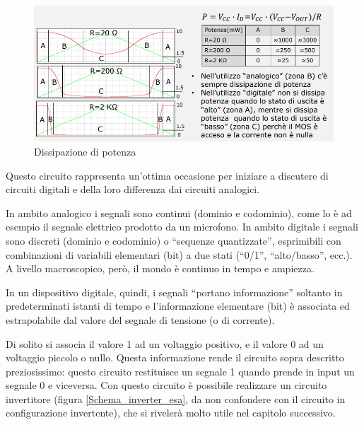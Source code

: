 \documentclass{article}
\begin{document}
\begin{figure}[h!]
  \centering
  \includegraphics[scale=0.58]{IM_inverter_penta}
  \caption{Dissipazione di potenza}
  \label{Schema_inverter_penta}
\end{figure}

\clearpage

Questo circuito rappresenta un'ottima occasione per iniziare a discutere di circuiti digitali e della loro differenza dai circuiti analogici. 

\vspace{3mm}

In ambito analogico i segnali sono continui (dominio e codominio), come lo è ad esempio il segnale elettrico prodotto da un microfono. In ambito digitale i segnali sono discreti (dominio e codominio) o ``sequenze quantizzate'', esprimibili con combinazioni di variabili elementari (bit) a due stati (``0/1'', ``alto/basso'', ecc.). A livello macroscopico, però, il mondo è continuo in tempo e ampiezza. 

\vspace{3mm}

In un dispositivo digitale, quindi, i segnali ``portano informazione'' soltanto in predeterminati istanti di tempo e l’informazione elementare (bit) è associata ed estrapolabile dal valore del segnale di tensione (o di corrente).

\vspace{1mm}

Di solito si associa il valore 1 ad un voltaggio positivo, e il valore 0 ad un voltaggio piccolo o nullo. Questa informazione rende il circuito sopra descritto preziosissimo: questo circuito restituisce un segnale 1 quando prende in input un segnale 0 e viceversa. Con questo circuito è possibile realizzare un circuito invertitore (figura \ref{Schema_inverter_esa}, da non confondere con il circuito in configurazione invertente), che si rivelerà molto utile nel capitolo successivo.
\end{document}
